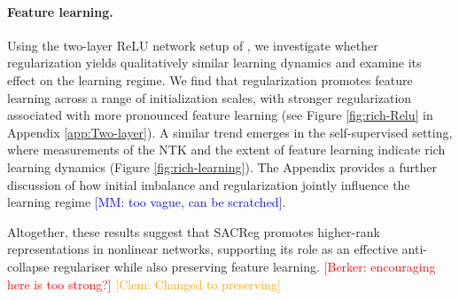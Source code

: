 \documentclass{article} %
\theoremstyle{remark}
\newcommand{\BD}[1]{\textcolor{red}{[Berker: #1]}}
\newcommand{\CD}[1]{\textcolor{orange}{[Clem: #1]}}
\newcommand{\mm}[1]{\textcolor{blue}{[MM: #1]}}
\begin{document}






\paragraph{Feature learning.} Using the two-layer ReLU network setup of \cite{kunin_2021_neural}, we investigate whether regularization yields qualitatively similar learning dynamics and examine its effect on the learning regime. We find that regularization promotes feature learning across a range of initialization scales, with stronger regularization associated with more pronounced feature learning (see Figure \ref{fig:rich-Relu} in Appendix \ref{app:Two-layer}). A similar trend emerges in the self-supervised setting, where measurements of the NTK and the extent of feature learning indicate rich learning dynamics (Figure \ref{fig:rich-learning}). The Appendix provides a further discussion of how initial imbalance and regularization jointly influence the learning regime \mm{too vague, can be scratched}.


Altogether, these results suggest that SACReg promotes higher-rank representations in nonlinear networks, supporting its role as an effective anti-collapse regulariser while also preserving feature learning. 
\BD{encouraging here is too strong?} \CD{Changed to preserving}


\end{document}
